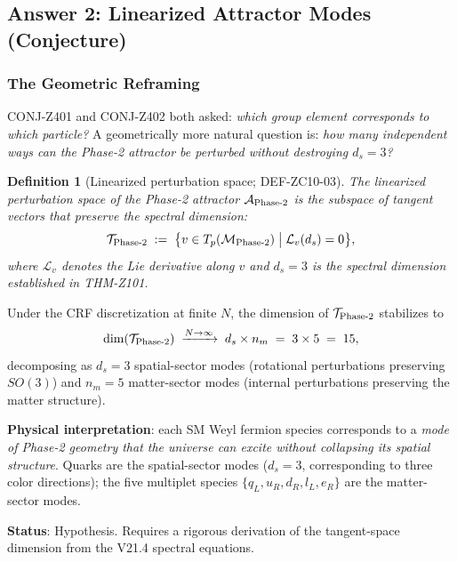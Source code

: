 \documentclass[12pt, a4paper]{article}
\newtheorem{definition}{Definition}[section]
\begin{document}
\subsection{Answer 2: Linearized Attractor Modes (Conjecture)}
\label{sec:attractor}

\subsubsection{The Geometric Reframing}

CONJ-Z401 and CONJ-Z402 both asked: \emph{which group element
corresponds to which particle?} A geometrically more natural
question is: \emph{how many independent ways can the Phase-2
attractor be perturbed without destroying $d_s = 3$?}

\begin{definition}[Linearized perturbation space; DEF-ZC10-03]
\label{def:tangent}
The \emph{linearized perturbation space} of the Phase-2 attractor
$\mathcal{A}_{\rm Phase\text{-}2}$ is the subspace of tangent vectors
that preserve the spectral dimension:
\begin{equation}
  \mathcal{T}_{\rm Phase\text{-}2}
  \;:=\;
  \bigl\{v \in T_p(\mathcal{M}_{\rm Phase\text{-}2})
  \;\big|\;
  \mathcal{L}_v(d_s) = 0\bigr\},
  \label{eq:tangent}
\end{equation}
where $\mathcal{L}_v$ denotes the Lie derivative along $v$ and
$d_s = 3$ is the spectral dimension established in THM-Z101.
\end{definition}

\begin{openqbox}[title={CONJ-Z404 (Attractor Modes) --- Open}]
Under the CRF discretization at finite $N$, the dimension of
$\mathcal{T}_{\rm Phase\text{-}2}$ stabilizes to
\begin{equation}
  \dim(\mathcal{T}_{\rm Phase\text{-}2})
  \;\xrightarrow{N \to \infty}\;
  d_s \times n_m \;=\; 3 \times 5 \;=\; 15,
  \label{eq:attractor-dim}
\end{equation}
decomposing as $d_s = 3$ spatial-sector modes (rotational
perturbations preserving $SO(3)$) and $n_m = 5$ matter-sector
modes (internal perturbations preserving the matter structure).

\textbf{Physical interpretation}: each SM Weyl fermion species
corresponds to a \emph{mode of Phase-2 geometry that the universe
can excite without collapsing its spatial structure}. Quarks
are the spatial-sector modes ($d_s = 3$, corresponding to
three color directions); the five multiplet species
$\{q_L, u_R, d_R, l_L, e_R\}$ are the matter-sector modes.

\textbf{Status}: Hypothesis. Requires a rigorous derivation
of the tangent-space dimension from the V21.4 spectral equations.
\end{openqbox}
\end{document}
